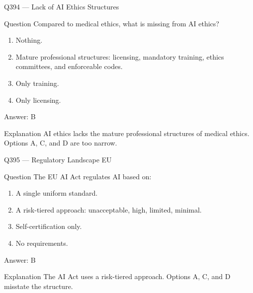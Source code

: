 \documentclass[aspectratio=169,8pt]{beamer}
\begin{document}
	\begin{frame}{Q394 --- Lack of AI Ethics Structures}
		\begin{block}{Question}
			Compared to medical ethics, what is missing from AI ethics?
			\begin{enumerate}
				\item Nothing.
				\item Mature professional structures: licensing, mandatory training, ethics committees, and enforceable codes.
				\item Only training.
				\item Only licensing.
			\end{enumerate}
		\end{block}
		\begin{exampleblock}{Answer: B}\end{exampleblock}
		\begin{block}{Explanation}
			AI ethics lacks the mature professional structures of medical ethics. Options A, C, and D are too narrow.
		\end{block}
	\end{frame}
	
	\begin{frame}{Q395 --- Regulatory Landscape EU}
		\begin{block}{Question}
			The EU AI Act regulates AI based on:
			\begin{enumerate}
				\item A single uniform standard.
				\item A risk-tiered approach: unacceptable, high, limited, minimal.
				\item Self-certification only.
				\item No requirements.
			\end{enumerate}
		\end{block}
		\begin{exampleblock}{Answer: B}\end{exampleblock}
		\begin{block}{Explanation}
			The AI Act uses a risk-tiered approach. Options A, C, and D misstate the structure.
		\end{block}
	\end{frame}
	
\end{document}
